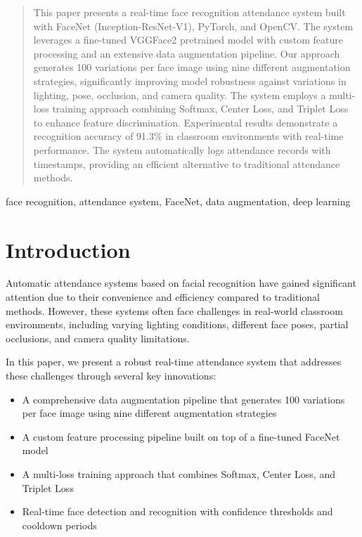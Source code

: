 \documentclass[conference]{IEEEtran}
\begin{document}
\begin{abstract}
This paper presents a real-time face recognition attendance system built with FaceNet (Inception-ResNet-V1), PyTorch, and OpenCV. The system leverages a fine-tuned VGGFace2 pretrained model with custom feature processing and an extensive data augmentation pipeline. Our approach generates 100 variations per face image using nine different augmentation strategies, significantly improving model robustness against variations in lighting, pose, occlusion, and camera quality. The system employs a multi-loss training approach combining Softmax, Center Loss, and Triplet Loss to enhance feature discrimination. Experimental results demonstrate a recognition accuracy of 91.3\% in classroom environments with real-time performance. The system automatically logs attendance records with timestamps, providing an efficient alternative to traditional attendance methods.
\end{abstract}

\begin{IEEEkeywords}
face recognition, attendance system, FaceNet, data augmentation, deep learning
\end{IEEEkeywords}

\section{Introduction}
Automatic attendance systems based on facial recognition have gained significant attention due to their convenience and efficiency compared to traditional methods. However, these systems often face challenges in real-world classroom environments, including varying lighting conditions, different face poses, partial occlusions, and camera quality limitations.

In this paper, we present a robust real-time attendance system that addresses these challenges through several key innovations:

\begin{itemize}
\item A comprehensive data augmentation pipeline that generates 100 variations per face image using nine different augmentation strategies
\item A custom feature processing pipeline built on top of a fine-tuned FaceNet model
\item A multi-loss training approach that combines Softmax, Center Loss, and Triplet Loss
\item Real-time face detection and recognition with confidence thresholds and cooldown periods
\end{itemize}
\end{document}
